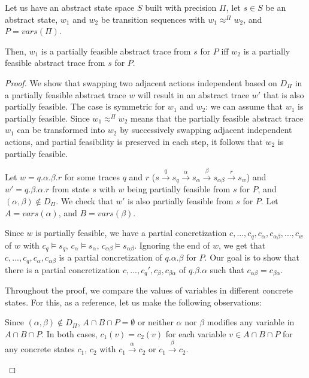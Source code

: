\documentclass[numbook]{svjour3}
\begin{document}
\begin{theorem}
	\label{theorem:por-partial-feasibility-equivalence}
	Let us have an abstract state space $S$ built with precision $\Pi$, let $s \in S$ be an abstract state, $w_1$ and $w_2$ be transition sequences with $w_1 \approx^\Pi w_2$, and $P = {vars}(\Pi)$.
	
	Then, $w_1$ is a partially feasible abstract trace from $s$ for $P$ iff $w_2$ is a partially feasible abstract trace from $s$ for $P$.
\end{theorem}

\begin{proof}
	We show that swapping two adjacent actions independent based on $D_\Pi$ in a partially feasible abstract trace $w$ will result in an abstract trace $w'$ that is also partially feasible. The case is symmetric for $w_1$ and $w_2$: we can assume that $w_1$ is partially feasible. Since $w_1 \approx^\Pi w_2$ means that the partially feasible abstract trace $w_1$ can be transformed into $w_2$ by successively swapping adjacent independent actions, and partial feasibility is preserved in each step, it follows that $w_2$ is partially feasible.
	
	Let $w = q.\alpha.\beta.r$ for some traces $q$ and $r$ ($s \xrightarrow{q} s_q \xrightarrow{\alpha} s_\alpha \xrightarrow{\beta} s_{\alpha\beta} \xrightarrow{r} s_w$) and $w' = q.\beta.\alpha.r$ from state $s$ with $w$ being partially feasible from $s$ for $P$, and $(\alpha, \beta) \notin D_\Pi$. We check that $w'$ is also partially feasible from $s$ for $P$. Let $A = {vars}(\alpha)$, and $B = {vars}(\beta)$.
	
	Since $w$ is partially feasible, we have a partial concretization $c, ..., c_q, c_\alpha, c_{\alpha\beta}, ..., c_w$ of $w$ with $c_q \models s_q$, $c_\alpha \models s_\alpha$, $c_{\alpha\beta} \models s_{\alpha\beta}$. Ignoring the end of $w$, we get that $c, ..., c_q, c_\alpha, c_{\alpha\beta}$ is a partial concretization of $q.\alpha.\beta$ for $P$. Our goal is to show that there is a partial concretization $c, ..., c_q', c_\beta, c_{\beta\alpha}$ of $q.\beta.\alpha$ such that $c_{\alpha\beta} = c_{\beta\alpha}$.
	
	Throughout the proof, we compare the values of variables in different concrete states. For this, as a reference, let us make the following observations:
	
	\begin{observation}
		\label{por-observation1}
		Since $(\alpha, \beta) \notin D_\Pi$, $A \cap B \cap P = \emptyset$ or neither $\alpha$ nor $\beta$ modifies any variable in $A \cap B \cap P$. In both cases, $c_1(v) = c_2(v)$ for each variable $v \in A \cap B \cap P$ for any concrete states $c_1$, $c_2$ with $c_1 \xrightarrow{\alpha} c_2$ or $c_1 \xrightarrow{\beta} c_2$.
	\end{observation}
	

\end{proof}
\end{document}
